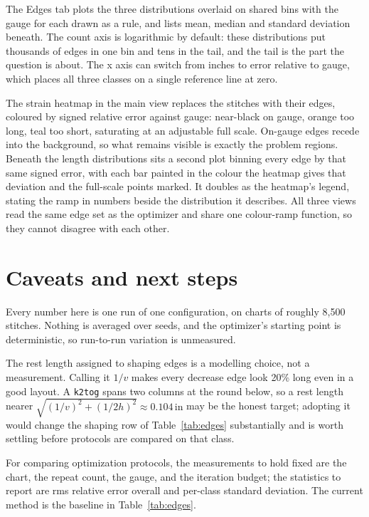 \documentclass[11pt]{article}
\begin{document}
The Edges tab plots the three distributions overlaid on shared bins with the
gauge for each drawn as a rule, and lists mean, median and standard deviation
beneath. The count axis is logarithmic by default: these distributions put
thousands of edges in one bin and tens in the tail, and the tail is the part
the question is about. The x axis can switch from inches to error relative to
gauge, which places all three classes on a single reference line at zero.

The strain heatmap in the main view replaces the stitches with their edges,
coloured by signed relative error against gauge: near-black on gauge, orange
too long, teal too short, saturating at an adjustable full scale. On-gauge
edges recede into the background, so what remains visible is exactly the
problem regions. Beneath the length distributions sits a second plot binning
every edge by that same signed error, with each bar painted in the colour the
heatmap gives that deviation and the full-scale points marked. It doubles as
the heatmap's legend, stating the ramp in numbers beside the distribution it
describes. All three views read the same edge set as the optimizer and share
one colour-ramp function, so they cannot disagree with each other.

\section{Caveats and next steps}

Every number here is one run of one configuration, on charts of roughly
8{,}500 stitches. Nothing is averaged over seeds, and the optimizer's
starting point is deterministic, so run-to-run variation is unmeasured.

The rest length assigned to shaping edges is a modelling choice, not a
measurement. Calling it $1/v$ makes every decrease edge look 20\% long even in
a good layout. A \texttt{k2tog} spans two columns at the round below, so a rest
length nearer $\sqrt{(1/v)^2 + (1/2h)^2} \approx 0.104\,\text{in}$ may be the
honest target; adopting it would change the shaping row of
Table~\ref{tab:edges} substantially and is worth settling before protocols are
compared on that class.

For comparing optimization protocols, the measurements to hold fixed are the
chart, the repeat count, the gauge, and the iteration budget; the statistics to
report are rms relative error overall and per-class standard deviation. The
current method is the baseline in Table~\ref{tab:edges}.
\end{document}
